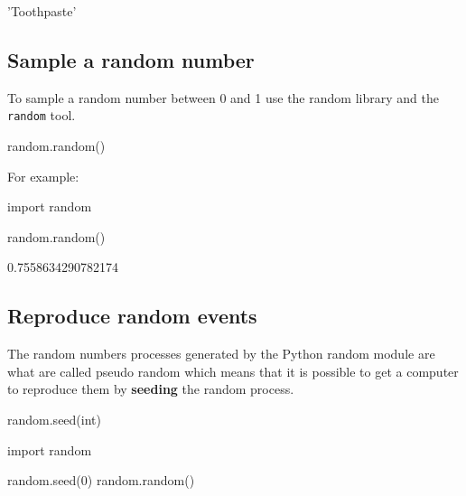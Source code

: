 \begin{raw}
'Toothpaste'
\end{raw}






\subsection{Sample a random number}
\label{\detokenize{tools-for-mathematics/06-probability/how/main:sample-a-random-number}}

To sample a random number between 0 and 1 use the random library and the
\texttt{random} tool.


\begin{api}
random.random()
\end{api}



For example:





\begin{pyin}
import random

random.random()
\end{pyin}





\begin{raw}
0.7558634290782174
\end{raw}






\subsection{Reproduce random events}
\label{sec:reproduce_random_events}

The random numbers processes generated by the Python random module are what are
called pseudo random which means that it is possible to get a computer to reproduce them by
\textbf{seeding} the random process.


\begin{api}
random.seed(int)
\end{api}





\begin{pyin}
import random

random.seed(0)
random.random()
\end{pyin}





